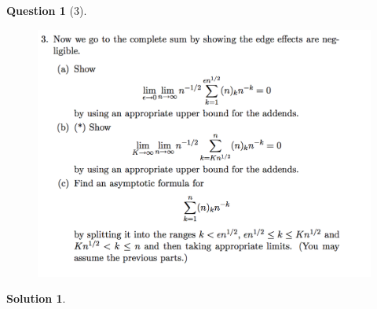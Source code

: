 \documentclass{article} %
\theoremstyle{quest}
\newtheorem*{question}{Question}
\newtheorem*{solution}{Solution}
\begin{document}
\begin{question}[3]
\hfill
\begin{figure}[h!]
  \centering
    \includegraphics[width=1\textwidth]{PM-2-3.png}
\end{figure}
\end{question}
\begin{solution}
\end{solution}

\newpage
\end{document}
